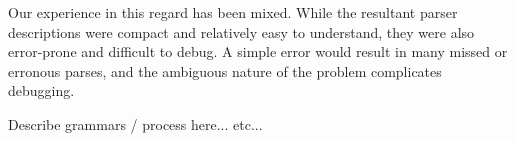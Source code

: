 Our experience in this regard has been mixed.  While the resultant parser 
descriptions were compact and relatively easy to understand, they were 
also error-prone and difficult to debug.  A simple error would result in
many missed or erronous parses, and the ambiguous nature of the problem
complicates debugging.

Describe grammars / process here... etc...
